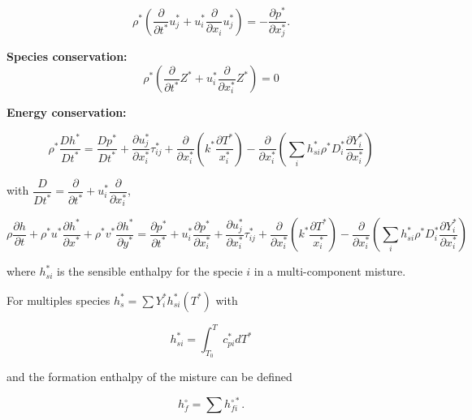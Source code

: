 \begin{equation} 
\rho^*
\left(
\frac{\partial}{\partial t^*}u_j^*
+
u_i^* 
\frac{\partial}{\partial x_i}u_j^*
\right)
=
-
\frac{\partial p^*}{\partial x_j^*} 
.
\end{equation} 

\textbf{Species conservation:}
\begin{equation} 
\rho^*
\left(
\frac{\partial}{\partial t^*}Z^*
+
u_i ^*
\frac{\partial}{\partial x_i^*}Z^*
\right)
=
0
\end{equation} 


\textbf{Energy conservation:}

\begin{equation}
\rho^*
\frac{D  h^* }{Dt^*}
=
\frac{D p^* }{Dt^*}
+
\frac{\partial u_j^*}{\partial x^*_i}
\tau_{ij}^*
+
\frac{\partial}{\partial x_i^*}
\left(
    k^*\frac{\partial T^*}{x_i^*}
\right)
-
\frac{\partial}{\partial x_i^*}
\left(
        \sum_i
        h_{si}^*
        \rho^*
        D_i^*
        \frac{\partial Y_i^*}{\partial x_i^*}
\right)
\end{equation} 

with  $\dfrac{D}{D t^*}=\dfrac{\partial}{\partial t^*}+u_i^*\dfrac{\partial }{\partial x^*_i}$, 

\begin{equation*}
\rho
\frac{\partial h}{\partial t} 
+
\rho^* u^* \frac{\partial h^*}{\partial x^*}+
\rho^* v^* \frac{\partial h^*}{\partial y^*}
=
\frac{\partial p^*}{\partial t^*}
+
u_i^*
\frac{\partial p^*}{\partial x^*_i}
+
\frac{\partial u_j^*}{\partial x^*_i}
\tau_{ij}^*
+
\frac{\partial}{\partial x_i^*}
\left(
    k^*\frac{\partial T^*}{x_i^*}
\right)
-
\frac{\partial}{\partial x_i^*}
\left(
        \sum_i
        h_{si}^*
        \rho^*
        D_i^*
        \frac{\partial Y_i^*}{\partial x_i^*}
\right)
\end{equation*} 

where $h_{si}^*$ is the sensible enthalpy 
for the specie $i$ in a multi-component misture.  

For multiples species $h_s^*=\sum Y_i^*h_{si}^*(T^*)$ with  

\begin{equation} 
h_{si}^*
=
\int_{T_0}^{T}
c_{pi}^*dT^*
\end{equation} 

and the formation enthalpy of the misture  
can be defined 

\begin{equation} 
   h_{f}^\circ
   =
   \sum
   h_{fi}^{\circ*}
   .
\end{equation} 

